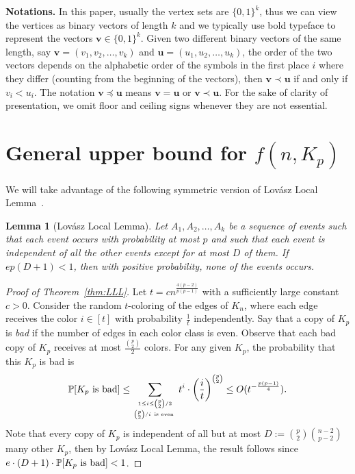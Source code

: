 \documentclass[11pt]{article}
\newtheorem{lemma}[theorem]{Lemma}
\theoremstyle{definition}
\begin{document}
{\bf \noindent Notations.} In this paper, usually the vertex sets are $\{0,1\}^{k}$, thus we can view the vertices as binary vectors of length $k$ and we typically use bold typeface to represent the vectors $\boldsymbol{v}\in\{0,1\}^{k}$. Given two different binary vectors of the same length, say $\boldsymbol{v}=(v_{1},v_{2},\ldots,v_{k})$ and $\boldsymbol{u}=(u_{1},u_{2},\ldots,u_{k})$, the order of the two vectors depends on the alphabetic order of the symbols in the first place $i$ where they differ (counting from the beginning of the vectors), then $\boldsymbol{v}\prec\boldsymbol{u}$ if and only if $v_{i}<u_{i}$. The notation $\boldsymbol{v}\preceq\boldsymbol{u}$ means $\boldsymbol{v}=\boldsymbol{u}$ or $\boldsymbol{v}\prec\boldsymbol{u}$. For the sake of clarity of presentation, we omit floor and ceiling signs whenever they are not essential.




\section{General upper bound for $f(n,K_{p})$}\label{sec:LLL}
We will take advantage of the following symmetric version of Lov\'{a}sz Local Lemma~\cite{2016AlonProb}.

\begin{lemma}[Lov\'{a}sz Local Lemma]
    Let $A_{1},A_{2},\ldots,A_{k}$ be a sequence of events such that each event occurs with probability at most $p$ and such that each event is independent of all the other events except for at most $D$ of them. If $ep(D+1)<1$, then with positive probability, none of the events occurs.
\end{lemma}

\begin{proof}[Proof of Theorem~\ref{thm:LLL}]

Let $t=cn^{\frac{4(p-2)}{p(p-1)}}$ with a sufficiently large constant $c>0$. Consider the random $t$-coloring of the edges of $K_{n}$, where each edge receives the color $i\in [t]$ with probability $\frac{1}{t}$ independently. Say that a copy of $K_{p}$ is \emph{bad} if the number of edges in each color class is even. Observe that each bad copy of $K_{p}$ receives at most $\frac{\binom{p}{2}}{2}$ colors. For any given $K_{p}$, the probability that this $K_{p}$ is bad is
\begin{equation*}
  \mathbb{P}[K_{p}\ \textup{is\ bad}] \le \sum\limits_{1\le i\le\binom{p}{2}/2\atop \binom{p}{2}/i\ \textup{is\ even }} t^{i}\cdot\bigg(\frac{i}{t}\bigg)^{\binom{p}{2}}\le O(t^{-\frac{p(p-1)}{4}}).
\end{equation*}
Note that every copy of $K_{p}$ is independent of all but at most $D:=\binom{p}{2}\binom{n-2}{p-2}$ many other $K_{p}$, then by Lov\'{a}sz Local Lemma, the result follows since $e\cdot(D+1)\cdot\mathbb{P}[K_{p}\ \textup{is\ bad}]<1$.

\end{proof}
\end{document}
